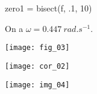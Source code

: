 \begin{multicols}{2}
\begin{corrige}
\begin{itemize}
\begin{python}
zero1 = bisect(f, .1, 10)
\end{python}
On a $\omega=\SI{0,447}{rad.s^{-1}}$.
\end{itemize}

\end{corrige}
\else
\fi



\ifprof
\else
\end{multicols}
\fi



\ifprof
\else

\begin{center}
\texttt{[image: fig\_03]}
\end{center}

\fi


\ifprof
\begin{center}
\texttt{[image: cor\_02]}
\end{center}

\else
\fi



\ifprof
\else
\begin{center}
\texttt{[image: img\_04]}
\end{center}
\fi

%
%
%



